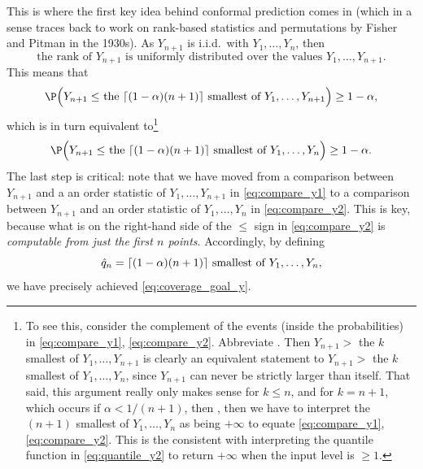 \documentclass{article}
\begin{document}
This is where the first key idea behind conformal prediction comes in (which in
a sense traces back to work on rank-based statistics and permutations by Fisher
and Pitman in the 1930s). As $Y_{n+1}$ is i.i.d.\ with $Y_1,\dots,Y_n$, then  
\begin{equation}
\label{eq:rank_uniform_y}
\text{the rank of $Y_{n+1}$ is uniformly distributed over the values 
  $Y_1,\dots,Y_{n+1}$}.
\end{equation}
This means that 
\begin{equation}
\label{eq:compare_y1}
\P\Big( \text{$Y_{n+1} \leq $ the $\lceil (1-\alpha)(n+1) \rceil$ smallest of
  $Y_1,\dots,Y_{n+1}$} \Big) \geq 1-\alpha,  
\end{equation}
which is in turn equivalent to\footnote{To see this, consider the complement of
  the events (inside the probabilities) in \eqref{eq:compare_y1},
  \eqref{eq:compare_y2}. Abbreviate . Then $Y_{n+1} >$ the $k$ smallest of $Y_1,\dots,Y_{n+1}$ is
  clearly an equivalent statement to $Y_{n+1} >$ the $k$ smallest of
  $Y_1,\dots,Y_n$, since $Y_{n+1}$ can never be strictly larger than
  itself. That said, this argument really only makes sense for $k \leq n$, and
  for $k = n+1$, which occurs if $\alpha < 1/(n+1)$, then , then we have to interpret the $(n+1)$
  smallest of $Y_1,\dots,Y_n$ as being $+\infty$ to equate
  \eqref{eq:compare_y1}, \eqref{eq:compare_y2}. This is the consistent with
  interpreting the quantile function in \eqref{eq:quantile_y2} to return
  $+\infty$ when the input level is $\geq 1$.}          
\begin{equation}
\label{eq:compare_y2}
\P\Big( \text{$Y_{n+1}\leq $ the $\lceil (1-\alpha)(n+1) \rceil$ smallest of
  $Y_1,\dots,Y_n$} \Big) \geq 1-\alpha. 
\end{equation}
The last step is critical: note that we have moved from a comparison between 
$Y_{n+1}$ and a an order statistic of $Y_1,\dots,Y_{n+1}$ in
\eqref{eq:compare_y1} to a comparison between $Y_{n+1}$ and an order statistic
of $Y_1,\dots,Y_n$ in \eqref{eq:compare_y2}. This is key, because what is on the
right-hand side of the $\leq$ sign in \eqref{eq:compare_y2} is \emph{computable
  from just the first $n$ points}. Accordingly, by defining  
\begin{equation}
\label{eq:quantile_y1}
\text{$\hat{q}_n = \lceil (1-\alpha)(n+1) \rceil$ smallest of $Y_1,\dots,Y_n$}, 
\end{equation}
we have precisely achieved \eqref{eq:coverage_goal_y}. 
\end{document}

